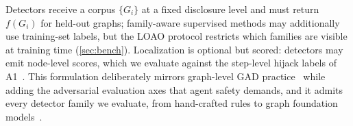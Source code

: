 Detectors receive a corpus $\{G_i\}$ at a fixed disclosure level and must return $f(G_i)$ for held-out graphs; family-aware supervised methods may additionally use training-set labels, but the LOAO protocol restricts which families are visible at training time (\cref{sec:bench}). Localization is optional but scored: detectors may emit node-level scores, which we evaluate against the step-level hijack labels of A1~\cite{pinjari2026agentdrift}. This formulation deliberately mirrors graph-level GAD practice~\cite{qiao2024deep} while adding the adversarial evaluation axes that agent safety demands, and it admits every detector family we evaluate, from hand-crafted rules to graph foundation models~\cite{qiao2025anomalygfm,zheng2026owleye}.
